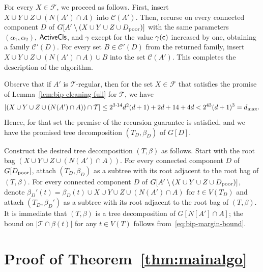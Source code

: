 \documentclass[11pt,a4paper]{article}
\theoremstyle{definition}
\def\T{\mathcal{T}}
\newcommand{\VV}{$\bigvee\mkern-15mu\bigvee$}
\begin{document}
For every $X \in \mathcal{F}$, we proceed as follows.
First, insert $X \cup Y \cup Z \cup (N(A') \cap A)$ into $\mathcal{C}(A')$. 
Then, recurse on every connected component
$D$ of $G[A' \setminus (X \cup Y \cup Z \cup D_{\mathrm{poor}})]$
with the same parameters $(\alpha_1,\alpha_2)$, $\mathsf{ActiveCls}$, and $\gamma$
except for the value $\gamma(\mathsf{c})$ increased by one,
obtaining a family $\mathcal{C}'(D)$.
For every set $B \in \mathcal{C}'(D)$ from the returned family,
insert $X \cup Y \cup Z \cup (N(A') \cap A) \cup B$ into the set $\mathcal{C}(A')$. 
This completes the description of the algorithm.

Observe that if $A'$ is $\T$-regular,
then for the set $X \in \mathcal{F}$ that satisfies 
the promise of Lemma~\ref{lem:bip-cleaning-full} for 
$\T$, we have 
\begin{equation}\label{eq:bip-margin-bound}
|(X \cup Y \cup Z \cup (N(A') \cap A)) \cap \T| \leq 2^{3 \cdot 14} d^2(d+1) + 2d + 14 + 4d < 2^{43} (d+1)^3 = \bigbound.
\end{equation}
Hence, for that set the premise of the recursion guarantee is satisfied,
and we have the promised tree decomposition $(T_D, \beta_D)$ of $G[D]$.

Construct the desired tree decomposition $(T,\beta)$ as follows. 
Start with the root bag $(X \cup Y \cup Z \cup (N(A') \cap A))$.
For every connected component $D$ of $G[D_{\mathrm{poor}}]$, attach $(T_D,\beta_D)$
as a subtree with its root adjacent to the root bag of $(T,\beta)$.
For every connected component $D$ of $G[A' \setminus (X \cup Y \cup Z \cup D_{\mathrm{poor}})]$,
denote $\beta_D'(t) = \beta_D(t) \cup X \cup Y \cup Z \cup (N(A') \cap A)$ for $t \in V(T_D)$
and attach $(T_D,\beta_D')$ as a subtree with its root adjacent to the root bag of $(T,\beta)$.
It is immediate that $(T,\beta)$ is a tree decomposition of $G[N[A'] \cap A]$;
the bound on $|\T \cap \beta(t)|$ for any $t \in V(T)$ follows from~\eqref{eq:bip-margin-bound}.



\section{Proof of Theorem~\ref{thm:mainalgo}}\label{sec:wrapup}
\newcommand{\subcomps}{\mathcal{C}}

\newcommand{\lmset}{\{\!\{}
\newcommand{\rmset}{\}\!\}}
\newcommand{\Aa}{\mathcal{A}}
\newcommand{\lbl}{\mathsf{label}}
\newcommand{\Multi}{\mathsf{Multi}}
\end{document}
